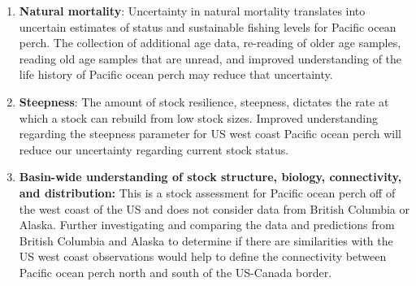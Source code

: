 \documentclass[12pt,]{article}
\begin{document}
\begin{enumerate}

\item \textbf{Natural mortality}: Uncertainty in natural mortality translates into uncertain estimates of status and sustainable fishing levels for Pacific ocean perch. The collection of additional age data, re-reading of older age samples, reading old age samples that are unread, and improved understanding of the life history of Pacific ocean perch may reduce that uncertainty.

\item \textbf{Steepness}: The amount of stock resilience, steepness, dictates the rate at which a stock can rebuild from low stock sizes.  Improved understanding regarding the steepness parameter for US west coast Pacific ocean perch will reduce our uncertainty regarding current stock status.

\item \textbf{Basin-wide understanding of stock structure, biology, connectivity, and distribution:} This is a stock assessment for Pacific ocean perch off of the west coast of the US and does not consider data from British Columbia or Alaska. Further investigating and comparing the data and predictions from British Columbia and Alaska to determine if there are similarities with the US west coast observations would help to define the connectivity between Pacific ocean perch north and south of the US-Canada border.

\end{enumerate}
\end{document}
